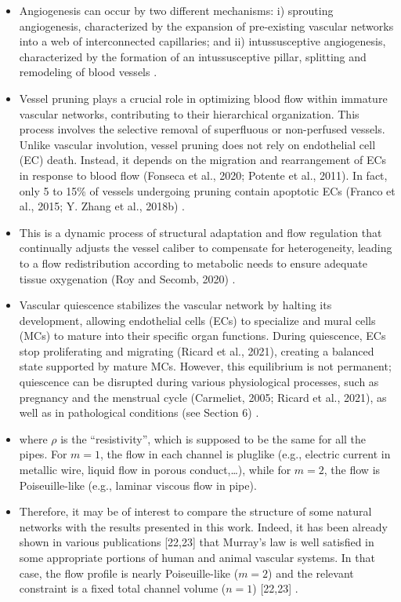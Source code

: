 \begin{itemize}
	 \item Angiogenesis can occur by two different mechanisms: i) sprouting angiogenesis, characterized by the expansion of pre-existing vascular networks into a web of interconnected capillaries; and ii) intussusceptive angiogenesis, characterized by the formation of an intussusceptive pillar, splitting and remodeling of blood vessels \cite{Ouarne2021}.
	 \item Vessel pruning plays a crucial role in optimizing blood flow within immature vascular networks, contributing to their hierarchical organization. This process involves the selective removal of superfluous or non-perfused vessels. Unlike vascular involution, vessel pruning does not rely on endothelial cell (EC) death. Instead, it depends on the migration and rearrangement of ECs in response to blood flow (Fonseca et al., 2020; Potente et al., 2011). In fact, only 5 to 15\% of vessels undergoing pruning contain apoptotic ECs (Franco et al., 2015; Y. Zhang et al., 2018b) \cite{Ouarne2021}.
	 \item This is a dynamic process of structural adaptation and flow regulation that continually adjusts the vessel caliber to compensate for heterogeneity, leading to a flow redistribution according to metabolic needs to ensure adequate tissue oxygenation (Roy and Secomb, 2020) \cite{Ouarne2021}.
	 \item Vascular quiescence stabilizes the vascular network by halting its development, allowing endothelial cells (ECs) to specialize and mural cells (MCs) to mature into their specific organ functions. During quiescence, ECs stop proliferating and migrating (Ricard et al., 2021), creating a balanced state supported by mature MCs. However, this equilibrium is not permanent; quiescence can be disrupted during various physiological processes, such as pregnancy and the menstrual cycle (Carmeliet, 2005; Ricard et al., 2021), as well as in pathological conditions (see Section 6) \cite{Ouarne2021}.
	 \item where $ \rho $ is the “resistivity”, which is supposed to be the same for all the pipes. For $ m = 1 $, the flow in each channel is pluglike (e.g., electric current in metallic wire, liquid flow in porous conduct,…), while for $ m=2 $, the flow is Poiseuille-like (e.g., laminar viscous flow in pipe)\cite{Durand2006}.
	 \item Therefore, it may be of interest to compare the structure of some natural networks with the results presented in this work. Indeed, it has been already shown in various publications [22,23] that Murray’s law is well satisfied in some appropriate portions of human and animal vascular systems. In that case, the flow profile is nearly Poiseuille-like ($ m=2 $) and the relevant constraint is a fixed total channel volume ($ n=1 $) [22,23] \cite{Durand2006}.

\end{itemize}
